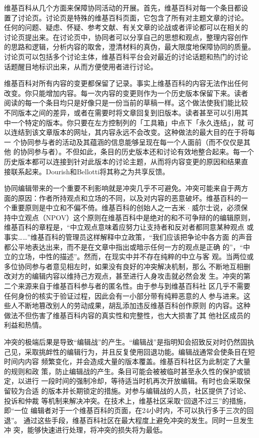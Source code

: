 维基百科从几个方面来保障协同活动的开展。首先，维基百科对每一个条目都设
置了讨论页。讨论页是特殊的维基百科页面，它包含了所有对主题文章的讨论。
任何的问题、疑虑、怀疑、参考文献、有关文章的论战或者评论都可以在相关的
讨论页提出来。在讨论页中，协同者可以分享自己的思想和观点，整理内容创作
的思路和逻辑，分析内容的取舍，澄清材料的真伪，最大限度地保障协同的质量。
讨论页可以包括多个讨论主体，维基百科平台会对最近的讨论话题和热门的讨论
话题醒目地标识出来，从而方便使用者进行讨论。

维基百科对所有内容的变更都保留了记录。事实上维基百科的内容无法作出任何
改变。你只能增加内容。每一次内容的变更则作为一个历史版本保留下来。读者
阅读的每一个条目均只是好像只是一份当前的草稿一样。这个做法使我们能比较
不同版本之间的差异，或者在需要时将文章回复到旧版本。读者甚至可以引用其
中一个特定的版本。你只要在左方控制列的「工具箱」中点下「永久连结」，就
可以连结到该文章版本的网址，其内容永远不会改变。这种做法的最大目的在于将每一
个协同参与者的活动及其蕴涵的信息能够呈现在每一个人面前（而不仅仅是其他
的协同参与者）。不但如此，条目的历史版本还和讨论有效地整合起来。每一个
历史版本都可以连接到针对此版本的讨论主题，从而将内容变更的原因和结果直
接联系起来。Dourish和Bellotti将其称之为共享反馈。

协同编辑带来的一个重要不利影响就是冲突几乎不可避免。冲突可能来自于两方
面的原因：作者所持观点和立场的不同，以及对内容的恶意破坏。维基百科的一
个重要原则是中立和不偏不倚。维基百科的创始人之一吉米 $\cdot$ 威尔士说，必须保
持中立观点（NPOV）这个原则在维基百科中是绝对的和不可争辩的的编辑原则，
维基百科的章程是，“中立观点意味着应努力让支持者和反对者都同意某种观点
或事实……”维基百科的管理员这样解释中立政策，“我们应该把争论中各方面
的声音都公平地表达出来，而不是在文章中指出或暗示任何一方的观点是正确
的”，“中立的立场，中性的描述”。然而，在现实中并不存在纯粹的中立与客
观。当两位或多位协同参与者意见相左时，如果没有良好的冲突解决机制，那么
不断地互相删改对方的编辑内容以维持己方观点，甚至进行人身攻击就必然会发
生。冲突的第二个来源来自于维基百科参与者的匿名性。由于参与到维基百科社
区几乎不需要任何身份的核实于验证过程，因此会有一小部分带有纯粹恶意的人
参与进来。这些人不断地篡改别人的劳动成果，胡乱添加违反维基百科创作原则
的内容。这种做法不但伤害了维基百科内容的真实性和完整性，也大大损害了其
他社区成员的利益和热情。

冲突的极端后果是导致“编辑战”的产生。“编辑战”是指明知会招致反对时仍然固执己见，采取挑衅性的编辑行为，并且反复使用回退功能。编辑战通常会使条目在短时间内内容
频繁变化，并会造成大量的版本覆盖。维基百科社区为此制定了大量的规则和政
策，防止编辑战的产生。条目可能会被被临时甚至永久性的保护或锁定，以进行
一段时间的强制冷却，等待适当时机再次开放编辑。有时也会采取保留较为合适
的版本并长期锁定的措施。对参与编辑战的人员，社区提供了讨论、投诉和仲裁
等机制来解决冲突。在技术上，维基社区采取“回退不过三”的措施，即“一位
编辑者对于一个维基百科的页面，在24小时内，不可以执行多于三次的回退”。
通过这些手段，维基百科社区在最大程度上避免冲突的发生。同时一旦发生冲
突，能够快速进行处理，将冲突的损失将为最低。


